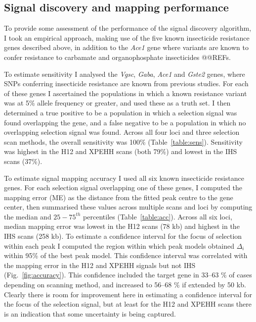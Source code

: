 \documentclass[a4paper,11pt,abstracton,hidelinks]{scrartcl}
\begin{document}
\subsection{Signal discovery and mapping performance}\label{subsec:performance}


To provide some assessment of the performance of the signal discovery algorithm, I took an empirical approach, making use of the five known insecticide resistance genes described above, in addition to the \textit{Ace1} gene where variants are known to confer resistance to carbamate and organophosphate insecticides @@REFs.


To estimate sensitivity I analysed the \textit{Vgsc}, \textit{Gaba}, \textit{Ace1} and \textit{Gste2} genes, where SNPs conferring insecticide resistance are known from previous studies.
%
For each of these genes I ascertained the populations in which a known resistance variant was at 5\% allele frequency or greater, and used these as a truth set.
%
I then determined a true positive to be a population in which a selection signal was found overlapping the gene, and a false negative to be a population in which no overlapping selection signal was found.
%
Across all four loci and three selection scan methods, the overall sensitivity was 100\% (Table~\ref{table:sens}).
%
Sensitivity was highest in the H12 and XPEHH scans (both 79\%) and lowest in the IHS scans (37\%).
%


To estimate signal mapping accuracy I used all six known insecticide resistance genes.
%
For each selection signal overlapping one of these genes, I computed the mapping error (ME) as the distance from the fitted peak centre to the gene center, then summarised these values across multiple scans and loci by computing the median and $25-75^{th}$ percentiles (Table~\ref{table:acc}).
%
Across all six loci, median mapping error was lowest in the H12 scans (78 kb) and highest in the IHS scans (258 kb).
%
To estimate a confidence interval for the focus of selection within each peak I computed the region within which peak models obtained $\Delta_i$ within 95\% of the best peak model.
%
This confidence interval was correlated with the mapping error in the H12 and XPEHH signals but not IHS (Fig.~\ref{fig:accuracy}).
%
This confidence included the target gene in 33--63 \% of cases depending on scanning method, and increased to 56--68 \% if extended by 50 kb.
%
Clearly there is room for improvement here in estimating a confidence interval for the focus of the selection signal, but at least for the H12 and XPEHH scans there is an indication that some uncertainty is being captured.
\end{document}
